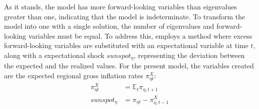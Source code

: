\documentclass[../thesis.tex]{subfiles}
\begin{document}
As it stands, the model has more forward-looking variables than eigenvalues greater than one, indicating that the model is indeterminate. To transform the model into one with a single solution, the number of eigenvalues and forward-looking variables must be equal. To address this, \textcite{farmer_solving_2015} employs a method where excess forward-looking variables are substituted with an expectational variable at time $t$, along with a expectational shock $sunspot_{\eta}$, representing the deviation between the expected and the realized values. For the present model, the variables created are the expected regional gross inflation rates $\pi_{\eta t}^{X}$:
\begin{align}
	\pi_{\eta t}^{X} &= \mathbb{E}_t \pi_{\eta, t+1} \label{eq_v2:reg-pix}\\
	sunspot_{\eta} &= \pi_{\eta t} - \pi_{\eta, t-1}^{X} \label{eq_v2:sunspot}
\end{align}
\end{document}
